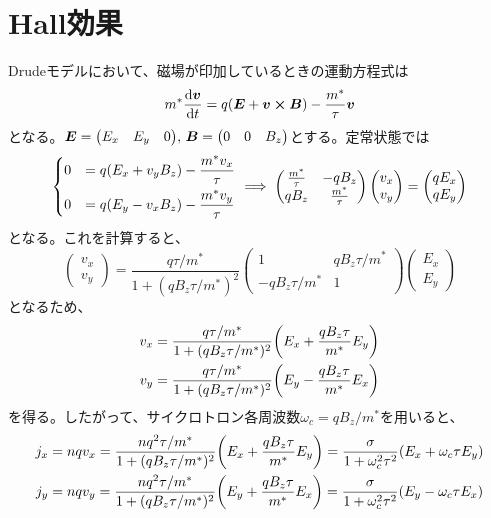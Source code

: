 \documentclass[a4paper,5pt,uplatex]{jsarticle}
\theoremstyle{mystyle} %
\begin{document}
\section{Hall効果}
Drudeモデルにおいて、磁場が印加しているときの運動方程式は
\begin{equation}
	m^*\dv{\bm{v}}{t} = q\qty(\bm{E} + \bm{v}\cross\bm{B}) -\frac{m^*}{\tau}\bm{v}
\end{equation}
となる。$\bm{E} = \mqty(E_x & E_y & 0),\,\bm{B} = \mqty(0 & 0 & B_z)$とする。定常状態では
\begin{equation}
	\begin{dcases}
		0 & = q\qty(E_x + v_yB_z) - \frac{m^*v_x}{\tau} \\
		0 & = q\qty(E_y - v_xB_z) - \frac{m^*v_y}{\tau}
	\end{dcases} \implies
	\begin{pmatrix}
		\frac{m^*}{\tau} & {-qB_z}            \\
		{qB_z}           & {\frac{m^*}{\tau}}
	\end{pmatrix}
	\begin{pmatrix}
		v_x \\
		v_y
	\end{pmatrix}
	= \begin{pmatrix}
		qE_x \\ qE_y
	\end{pmatrix}
\end{equation}
となる。これを計算すると、
\begin{equation}
	\begin{pmatrix}
		v_x \\ v_y
	\end{pmatrix}
	=\frac{q\tau/m^*}{1 + (qB_z\tau/m^*)^2}
	\begin{pmatrix}
		1             & qB_z\tau/m^* \\
		-qB_z\tau/m^* & 1
	\end{pmatrix}
	\begin{pmatrix}
		E_x \\ E_y
	\end{pmatrix}
\end{equation}
となるため、
\begin{align}
	v_x & = \frac{q\tau/m^*}{1+(qB_z\tau/m^*)^2}\qty(E_x + \frac{qB_z\tau}{m^*}E_y) \\
	v_y & = \frac{q\tau/m^*}{1+(qB_z\tau/m^*)^2}\qty(E_y - \frac{qB_z\tau}{m^*}E_x)
\end{align}
を得る。したがって、サイクロトロン各周波数$\omega_c = qB_z/m^*$を用いると、
\begin{align}
	j_x & = nqv_x = \frac{nq^2\tau/m^*}{1+(qB_z\tau/m^*)^2}\qty(E_x + \frac{qB_z\tau}{m^*}E_y) = \frac{\sigma}{1+\omega_c^2\tau^2}\qty(E_x + \omega_c\tau{}E_y) \\
	j_y & = nqv_y = \frac{nq^2\tau/m^*}{1+(qB_z\tau/m^*)^2}\qty(E_y + \frac{qB_z\tau}{m^*}E_x) = \frac{\sigma}{1+\omega_c^2\tau^2}\qty(E_y - \omega_c\tau{}E_x)
\end{align}
\end{document}
